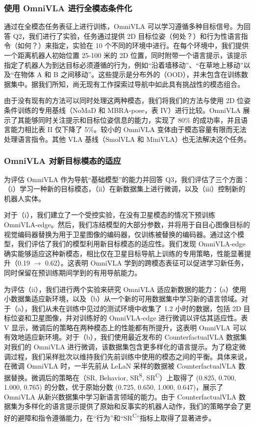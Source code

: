 \subsubsection{使用 OmniVLA 进行全模态条件化}

通过在全模态任务表征上进行训练，OmniVLA 可以学习遵循多种目标信号。为回答 Q2，我们进行了实验，任务通过提供 2D 目标位姿（何处？）和行为性语言指令（如何？）来指定，实验在 10 个不同的环境中进行。在每个环境中，我们提供一个距离机器人初始位置 25-100 米的 2D 位置，同时附带一个语言提示，该提示指定了机器人为到达目标必须遵循的行为，例如“沿着墙移动”、“在草地上移动”以及“在物体 A 和 B 之间移动”。这些提示是分布外的（OOD），并未包含在训练数据集中。据我们所知，尚无现有工作探索过导航中如此具有挑战性的模态组合。

由于没有现有的方法可以同时处理这两种模态，我们将我们的方法与使用 2D 位姿条件训练的专用基线（NoMaD 和 MBRA-pose，表 IV）进行比较。OmniVLA 展示了其能够同时关注提示和目标位姿信息的能力，实现了 80\% 的成功率，并且语言能力相比表 II 仅下降了 5\%。较小的 OmniVLA 变体由于模态容量有限而无法处理语言指令。其他 VLA 基线（SmolVLA 和 MiniVLA）也无法解决这个任务。

\subsubsection{OmniVLA 对新目标模态的适应}

为评估 OmniVLA 作为导航“基础模型”的能力并回答 Q3，我们评估了三个方面：（i）学习一种新的目标模态，（ii）在新数据集上进行微调，以及（iii）控制新的机器人实体。

对于（i），我们建立了一个受控实验，在没有卫星模态的情况下预训练 OmniVLA-edge。然后，我们冻结模型的大部分参数，并将用于自目心图像目标的视觉编码器替换为用于卫星图像的编码器，仅训练被替换的编码器。通过这个模型，我们评估了我们的模型利用新目标模态的适应性。我们发现 OmniVLA-edge 确实能够适应这种新模态，相比仅在卫星目标导航上训练的专用策略，性能显著提升（0.19 $\rightarrow$ 0.62）。这表明 OmniVLA 学到的跨模态表征可以促进学习新任务，同时保留在预训练期间学到的有用导航能力。

为评估（ii），我们进行两个实验来研究 OmniVLA 适应新数据的能力：（a）使用小数据集适应新环境，以及（b）从一个新的可用数据集中学习新的语言领域。对于（a），我们从未在训练中见过的测试环境中收集了 1.2 小时的数据，包括 2D 目标位姿和卫星图像，并对训练好的 OmniVLA-edge 进行微调以评估其适应性。表 V 显示，微调后的策略在两种模态上的性能都有所提升，这表明 OmniVLA 可以有效地适应新环境。对于（b），我们使用最近发布的 CounterfactualVLA 数据集对我们的 OmniVLA 进行微调，该数据集包含更多样化的语言提示。为了稳定微调过程，我们采样批次以维持我们先前训练中使用的模态之间的平衡。具体来说，在微调 OmniVLA 时，一半先前从 LeLaN 采样的数据被 CounterfactualVLA 数据替换。微调后的策略在（SR, Behavior, SR\textsuperscript{S}, SR\textsuperscript{C}）上取得了 (0.825, 0.700, 1.000, 0.765) 的分数，优于原始分数 (0.725, 0.650, 1.000, 0.647)，展示了 OmniVLA 从新兴数据集中学习新语言领域的能力。由于 CounterfactualVLA 数据集为多样化的语言提示提供了原始和反事实的机器人动作，我们的策略学会了更好的避障和指令遵循能力，在“行为”和“SR\textsuperscript{C}”指标上取得了显著进步。


